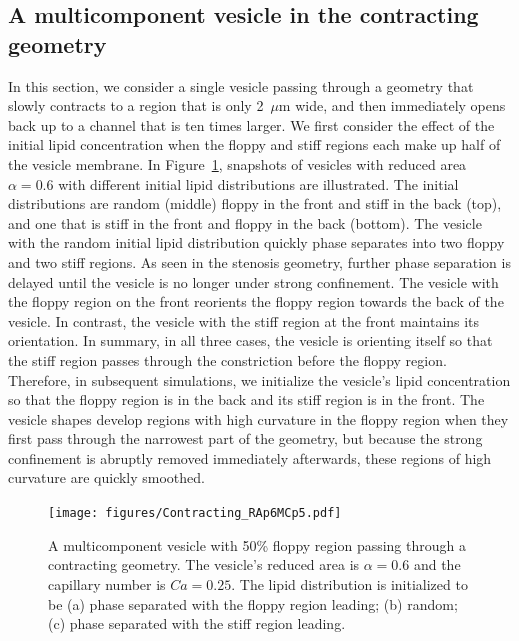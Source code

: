 \documentclass[twoside,twocolumn,9pt]{article}
\newcommand{\subfigimg}[3][,]{%
  \setbox1=\hbox{\texttt{[image: \#3]}}%
  \leavevmode\rlap{\usebox1}%
  \rlap{\hspace*{0pt}\raisebox{\dimexpr\ht1-0\baselineskip}{\bf
  \normalsize #2}}%
  \phantom{\usebox1}%
}
\begin{document}
\subsection{\label{subsec:Contraction} A multicomponent vesicle in the
contracting geometry}
In this section, we consider a single vesicle passing through a geometry
that slowly contracts to a region that is only 2~$\mu$m wide, and then
immediately opens back up to a channel that is ten times larger. We
first consider the effect of the initial lipid concentration when the
floppy and stiff regions each make up half of the vesicle membrane. In
Figure~\ref{fig:RA6leftRightRand}, snapshots of vesicles with reduced
area $\alpha = 0.6$ with different initial lipid distributions are
illustrated. The initial distributions are random (middle) floppy in the
front and stiff in the back (top), and one that is stiff in the front
and floppy in the back (bottom). The vesicle with the random initial
lipid distribution quickly phase separates into two floppy and two stiff
regions. As seen in the stenosis geometry, further phase separation is
delayed until the vesicle is no longer under strong confinement. The
vesicle with the floppy region on the front reorients the floppy region
towards the back of the vesicle. In contrast, the vesicle with the stiff
region at the front maintains its orientation. In summary, in all three
cases, the vesicle is orienting itself so that the stiff region passes
through the constriction before the floppy region.  Therefore, in
subsequent simulations, we initialize the vesicle's lipid concentration
so that the floppy region is in the back and its stiff region is in the
front. The vesicle shapes develop regions with high curvature in the
floppy region when they first pass through the narrowest part of the
geometry, but because the strong confinement is abruptly removed
immediately afterwards, these regions of high curvature are quickly
smoothed. 

\begin{figure}[h]
  \centering
  \texttt{[image: figures/Contracting\_RAp6MCp5.pdf]}
  \caption{\label{fig:RA6leftRightRand} \small A multicomponent vesicle
  with 50\% floppy region passing through a contracting geometry. The
  vesicle's reduced area is $\alpha = 0.6$ and the capillary number is
  $Ca = 0.25$. The lipid distribution is initialized to be (a) phase
  separated with the floppy region leading; (b) random; (c) phase
  separated with the stiff region leading.}
\end{figure}
\end{document}
